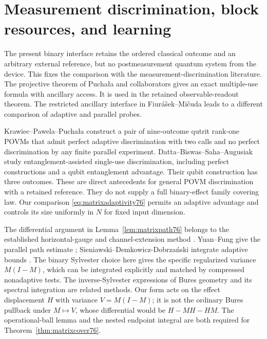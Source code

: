 \section{Measurement discrimination, block resources, and learning}
\label{sec:matrixcomparison76}
\label{sec:blockcomparison78}
The present binary interface retains the ordered classical outcome
and an arbitrary external reference, but no postmeasurement quantum
system from the device. This fixes the comparison with the
measurement-discrimination literature. The projective theorem of
Pucha\l a and collaborators \cite[Corollary~1 and Theorem~2]{PPKKO72}
gives an exact multiple-use formula with ancillary access. It is
used in the retained observable-readout theorem. The restricted
ancillary interface in Fiur\'a\v sek--Mi\v cuda \cite{FM75} leads
to a different comparison of adaptive and parallel probes.

Krawiec--Pawela--Pucha\l a \cite[Section~4]{KPP76} construct a pair
of nine-outcome qutrit rank-one POVMs that admit perfect adaptive
discrimination with two calls and no perfect discrimination by
any finite parallel experiment. Datta--Biswas--Saha--Augusiak
\cite[Theorems~3--5]{DBSA76} study entanglement-assisted
single-use discrimination, including perfect constructions and a
qubit entanglement advantage. Their qubit construction has three
outcomes. These are direct antecedents for general POVM
discrimination with a retained reference. They do not supply a
full binary-effect family covering law. Our comparison
\eqref{eq:matrixadaptivity76} permits an adaptive advantage and
controls its size uniformly in $N$ for fixed input dimension.

The differential argument in Lemma~\ref{lem:matrixpath76} belongs
to the established horizontal-gauge and channel-extension method
\cite{FI76,DKG67,DM76,KGAD76}. Yuan--Fung give the parallel path estimate
\cite[Section~III, equation~(26), PDF version~3]{YF76};
Sieniawski--Demkowicz-Dobrza\'nski integrate adaptive bounds
\cite[Section~IV.A]{SD76}. The binary Sylvester choice here gives the
specific regularized variance $M(I-M)$, which can be integrated
explicitly and matched by compressed nonadaptive tests. The
inverse-Sylvester expressions of Bures geometry
\cite{Dittmann76} and its spectral integration
\cite{SZGeom76} are related methods. Our form acts on the effect
displacement $H$ with variance $V=M(I-M)$; it is not the ordinary
Bures pullback under $M\mapsto V$, whose differential would be
$H-MH-HM$. The operational-ball lemma and the nested endpoint
integral are both required for Theorem~\ref{thm:matrixcover76}.

